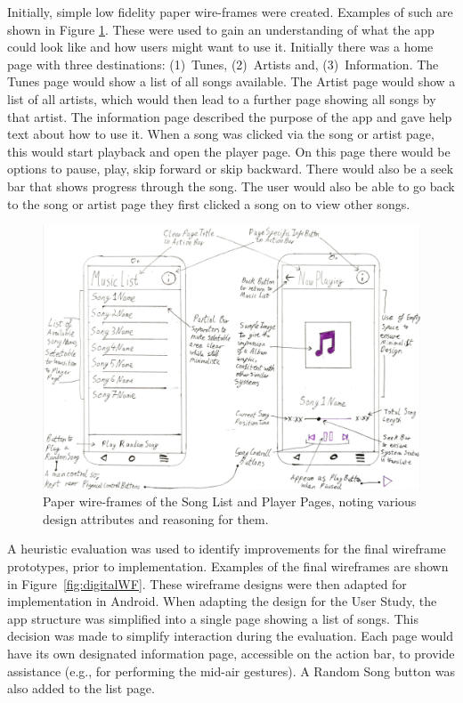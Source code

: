 \documentclass{l4proj}
\begin{document}
Initially, simple low fidelity paper wire-frames were created. Examples of such are shown in Figure \ref{fig:paperWF}. These were used to gain an understanding of what the app could look like and how users might want to use it. Initially there was a home page with three destinations: (1)~Tunes, (2)~Artists and, (3)~Information. The Tunes page would show a list of all songs available. The Artist page would show a list of all artists, which would then lead to a further page showing all songs by that artist. The information page described the purpose of the app and gave help text about how to use it. When a song was clicked via the song or artist page, this would start playback and open the player page. On this page there would be options to pause, play, skip forward or skip backward. There would also be a seek bar that shows progress through the song. The user would also be able to go back to the song or artist page they first clicked a song on to view other songs.

\begin{figure}[!htb]
    \centering
    \includegraphics[scale=0.0675]{images/papWF.jpg}
        \caption{Paper wire-frames of the Song List and Player Pages, noting various design attributes and reasoning for them.}
        \label{fig:paperWF}
\end{figure}

A heuristic evaluation was used to identify improvements for the final wireframe prototypes, prior to implementation. Examples of the final wireframes are shown in Figure~\ref{fig:digitalWF}. These wireframe designs were then adapted for implementation in Android. When adapting the design for the User Study, the app structure was simplified into a single page showing a list of songs. This decision was made to simplify interaction during the evaluation. Each page would have its own designated information page, accessible on the action bar, to provide assistance (e.g., for performing the mid-air gestures). A Random Song button was also added to the list page.
\end{document}
